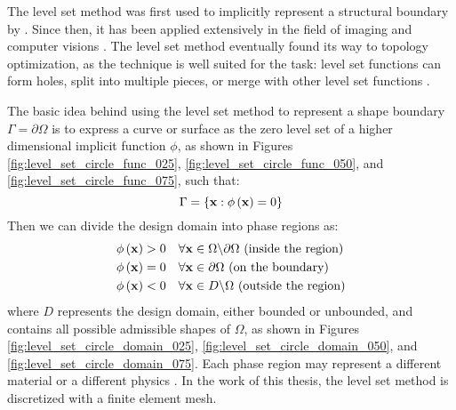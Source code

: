 The level set method was first used to implicitly represent a structural boundary by \citep{OS:88}. Since then, it has been applied extensively in the field of imaging and computer visions \citep{OP:03}. The level set method eventually found its way to topology optimization, as the technique is well suited for the task: level set functions can form holes, split into multiple pieces, or merge with other level set functions \citep{WW:04c,AJT:02,OS:88}. 

The basic idea behind using the level set method to represent a shape boundary $\Gamma = \partial \Omega$ is to express a curve or surface as the zero level set of a higher dimensional implicit function $\phi$, as shown in Figures \ref{fig:level_set_circle_func_025}, \ref{fig:level_set_circle_func_050}, and \ref{fig:level_set_circle_func_075}, such that:
%
\begin{equation}
	\centering
	\label{eq:isolevel}
	\Gamma = \lbrace \mathbf{x} : \phi\left(\mathbf{x}\right) = 0 \rbrace
\end{equation}
%
Then we can divide the design domain into phase regions as:
%
\begin{equation}
	\centering
	\label{eq:level_set_regions}
	\begin{split}
		\phi\left(\mathbf{x}\right) > 0 & \quad \forall \mathbf{x} \in \Omega \backslash \partial \Omega \text{ (inside the region)} \\
		\phi\left(\mathbf{x}\right) = 0 & \quad \forall \mathbf{x} \in \partial \Omega \text{ (on the boundary)} \\
		\phi\left(\mathbf{x}\right) < 0 & \quad \forall \mathbf{x} \in D \backslash \Omega \text{ (outside the region)}
	\end{split}
\end{equation}
%
where $D$ represents the design domain, either bounded or unbounded, and contains all possible admissible shapes of $\Omega$, as shown in Figures \ref{fig:level_set_circle_domain_025}, \ref{fig:level_set_circle_domain_050}, and \ref{fig:level_set_circle_domain_075}. Each phase region may represent a different material \citep{AJT:02,WW:04c,OS:01,SW:00} or a different physics \citep{LCB:06,GW:08}. In the work of this thesis, the level set method is discretized with a finite element mesh.
%
